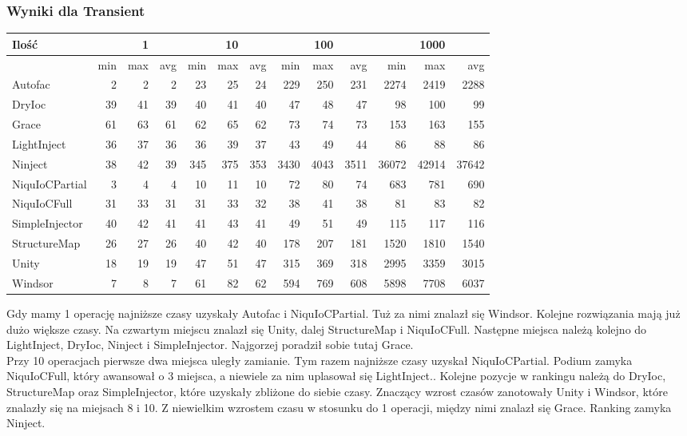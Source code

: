 \documentclass[12pt]{article}
\begin{document}
\subsubsection{Wyniki dla Transient}
\begin{center}
\begin{small}
	\begin{tabular}{ | l | r r r | r r r | r r r | r r r | }
    		\hline
Ilość & & 1 & & & 10 & & & 100 & & & 1000 & \\ \hline
 & min & max & avg & min & max & avg & min & max & avg & min & max & avg \\ \hline
Autofac & 2 & 2 & 2 & 23 & 25 & 24 & 229 & 250 & 231 & 2274 & 2419 & 2288 \\ \hline
DryIoc & 39 & 41 & 39 & 40 & 41 & 40 & 47 & 48 & 47 & 98 & 100 & 99 \\ \hline
Grace & 61 & 63 & 61 & 62 & 65 & 62 & 73 & 74 & 73 & 153 & 163 & 155 \\ \hline
LightInject & 36 & 37 & 36 & 36 & 39 & 37 & 43 & 49 & 44 & 86 & 88 & 86 \\ \hline
Ninject & 38 & 42 & 39 & 345 & 375 & 353 & 3430 & 4043 & 3511 & 36072 & 42914 & 37642 \\ \hline
NiquIoCPartial & 3 & 4 & 4 & 10 & 11 & 10 & 72 & 80 & 74 & 683 & 781 & 690 \\ \hline
NiquIoCFull & 31 & 33 & 31 & 31 & 33 & 32 & 38 & 41 & 38 & 81 & 83 & 82 \\ \hline
SimpleInjector & 40 & 42 & 41 & 41 & 43 & 41 & 49 & 51 & 49 & 115 & 117 & 116 \\ \hline
StructureMap & 26 & 27 & 26 & 40 & 42 & 40 & 178 & 207 & 181 & 1520 & 1810 & 1540 \\ \hline
Unity & 18 & 19 & 19 & 47 & 51 & 47 & 315 & 369 & 318 & 2995 & 3359 & 3015 \\ \hline
Windsor & 7 & 8 & 7 & 61 & 82 & 62 & 594 & 769 & 608 & 5898 & 7708 & 6037 \\ \hline
  	\end{tabular}
\end{small}
\end{center}
Gdy mamy 1 operację najniższe czasy uzyskały Autofac i NiquIoCPartial. Tuż za nimi znalazł się Windsor. Kolejne rozwiązania mają już dużo większe czasy. Na czwartym miejscu znalazł się Unity, dalej StructureMap i NiquIoCFull. Następne miejsca należą kolejno do LightInject, DryIoc, Ninject i SimpleInjector. Najgorzej poradził sobie tutaj Grace.\\
Przy 10 operacjach pierwsze dwa miejsca uległy zamianie. Tym razem najniższe czasy uzyskał NiquIoCPartial. Podium zamyka NiquIoCFull, który awansował o 3 miejsca, a niewiele za nim uplasował się LightInject.. Kolejne pozycje w rankingu należą do DryIoc, StructureMap oraz SimpleInjector, które uzyskały zbliżone do siebie czasy. Znaczący wzrost czasów zanotowały Unity i Windsor, które znalazły się na miejsach 8 i 10. Z niewielkim wzrostem czasu w stosunku do 1 operacji, między nimi znalazł się Grace. Ranking zamyka Ninject.\\
\end{document}
